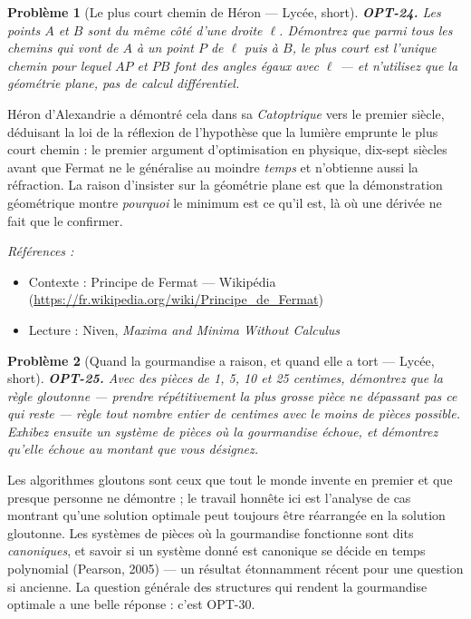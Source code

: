 \documentclass[11pt]{article}
\newtheorem{problem}{Problème}
\newenvironment{refs}{\par\small\noindent\emph{Références :}\begin{itemize}\setlength\itemsep{0pt}}{\end{itemize}\normalsize}
\begin{document}
\bigskip

\begin{problem}[{Le plus court chemin de Héron --- Lycée, short}]
\textbf{OPT-24.} Les points $A$ et $B$ sont du même côté d'une droite
$\ell$. Démontrez que parmi tous les chemins qui vont de $A$ à un point $P$ de $\ell$ puis
à $B$, le plus court est l'unique chemin pour lequel $AP$ et $PB$ font des angles égaux avec
$\ell$ --- et n'utilisez que la géométrie plane, pas de calcul différentiel.
\end{problem}

\noindent Héron d'Alexandrie a démontré cela dans sa \textit{Catoptrique} vers le premier
siècle, déduisant la loi de la réflexion de l'hypothèse que la lumière emprunte le plus court
chemin : le premier argument d'optimisation en physique, dix-sept siècles avant que Fermat ne le
généralise au moindre \textit{temps} et n'obtienne aussi la réfraction. La raison d'insister sur la
géométrie plane est que la démonstration géométrique montre \textit{pourquoi} le minimum est ce
qu'il est, là où une dérivée ne fait que le confirmer.

\begin{refs}
\item Contexte : Principe de Fermat --- Wikipédia (\url{https://fr.wikipedia.org/wiki/Principe_de_Fermat})
\item Lecture : Niven, \textit{Maxima and Minima Without Calculus}
\end{refs}

\bigskip

\begin{problem}[{Quand la gourmandise a raison, et quand elle a tort --- Lycée, short}]
\textbf{OPT-25.} Avec des pièces de 1, 5, 10 et 25 centimes, démontrez que la règle
gloutonne --- prendre répétitivement la plus grosse pièce ne dépassant pas ce qui reste --- règle tout
nombre entier de centimes avec le moins de pièces possible. Exhibez ensuite un système de pièces
où la gourmandise échoue, et démontrez qu'elle échoue au montant que vous désignez.
\end{problem}

\noindent Les algorithmes gloutons sont ceux que tout le monde invente en premier et que
presque personne ne démontre ; le travail honnête ici est l'analyse de cas montrant qu'une solution
optimale peut toujours être réarrangée en la solution gloutonne. Les systèmes de pièces où la
gourmandise fonctionne sont dits \textit{canoniques}, et savoir si un système donné est canonique se
décide en temps polynomial (Pearson, 2005) --- un résultat étonnamment récent pour une question si
ancienne. La question générale des structures qui rendent la gourmandise optimale a une belle
réponse : c'est OPT-30.
\end{document}
